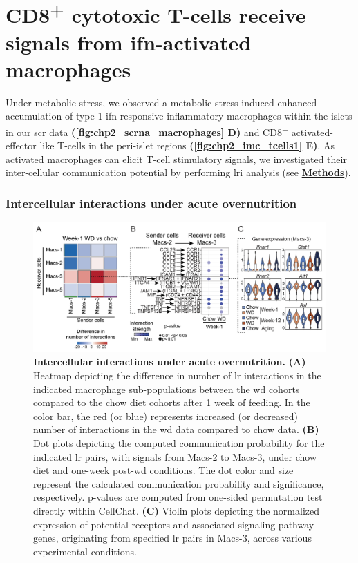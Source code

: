 
\section[CD8\textsuperscript{+} cytotoxic T-cells receive signals from \glsentryshort{ifn}-activated macrophages]{CD8\textsuperscript{+} cytotoxic T-cells receive signals from \gls{ifn}-activated\\macrophages}
\label{sec:chp2_cell_cell}

Under metabolic stress, we observed a metabolic stress-induced enhanced accumulation of type-1 \gls{ifn} responsive inflammatory macrophages within the islets in our \gls{scr} data \textbf{(\autoref{fig:chp2_scrna_macrophages} D)} and CD8\textsuperscript{+} activated-effector like T-cells in the peri-islet regions \textbf{(\autoref{fig:chp2_imc_tcells1} E)}. As activated macrophages can elicit T-cell stimulatory signals, we investigated their inter-cellular communication potential by performing \gls{lri} analysis (see \hyperref[subsubsec:met_chp2_cellcell]{\textbf{Methods}}).

\subsubsection{\large Intercellular interactions under acute overnutrition}


\begin{figure}[b!]
\centering
\includegraphics[width=\linewidth]{Chapter4/Fig/F2-6-01.png}
\caption[Intercellular interactions under acute overnutrition]{\textbf{Intercellular interactions under acute overnutrition.} \textbf{(A)} Heatmap depicting the difference in number of \gls{lr} interactions in the indicated macrophage sub-populations between the \gls{wd} cohorts compared to the chow diet cohorts after 1 week of feeding. In the color bar, the red (or blue) represents increased (or decreased) number of interactions in the \gls{wd} data compared to chow data. \textbf{(B)} Dot plots depicting the computed communication probability for the indicated \gls{lr} pairs, with signals from Macs-2 to Macs-3, under chow diet and one-week post-\gls{wd} conditions. The dot color and size represent the calculated communication probability and significance, respectively. p-values are computed from one-sided permutation test directly within CellChat. \textbf{(C)} Violin plots depicting the normalized expression of potential receptors and associated signaling pathway genes, originating from specified \gls{lr} pairs in Macs-3, across various experimental conditions.}
\label{fig:chp2_scrna_cellchat1}
\end{figure}

